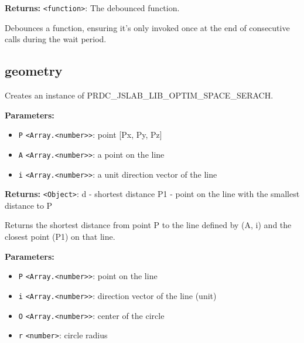 \documentclass[12pt,a4paper]{article}
\begin{document}
\noindent \textbf{Returns:} \texttt{<function>}: The debounced function.

\noindent Debounces a function, ensuring it's only invoked once at the end of consecutive calls during the wait period.


\subsection{geometry}
\vspace{5mm}
\noindent {}


\noindent Creates an instance of PRDC\_JSLAB\_LIB\_OPTIM\_SPACE\_SERACH.

\vspace{5mm}
\noindent {}


\noindent \textbf{Parameters:}
\begin{itemize}
  \item \texttt{P} \texttt{<Array.<number>>}: point [Px, Py, Pz]
  \item \texttt{A} \texttt{<Array.<number>>}: a point on the line
  \item \texttt{i} \texttt{<Array.<number>>}: a unit direction vector of the line
\end{itemize}

\noindent \textbf{Returns:} \texttt{<Object>}: d   - shortest distance
  P1  - point on the line with the smallest distance to P

\noindent Returns the shortest distance from point P to the line defined by (A, i)
and the closest point (P1) on that line.

\vspace{5mm}
\noindent {}


\noindent \textbf{Parameters:}
\begin{itemize}
  \item \texttt{P} \texttt{<Array.<number>>}: point on the line
  \item \texttt{i} \texttt{<Array.<number>>}: direction vector of the line (unit)
  \item \texttt{O} \texttt{<Array.<number>>}: center of the circle
  \item \texttt{r} \texttt{<number>}: circle radius
\end{itemize}
\end{document}
